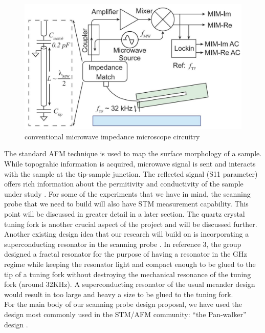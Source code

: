 \documentclass[11pt]{article}
\numberwithin{equation}{section}
\begin{document}
\begin{figure}
	\centering
	\includegraphics[scale=0.4] {mimcircuit.jpg}
	\caption{conventional microwave impedance microscope circuitry }
	\label{mimcircuit}
\end{figure}

The standard AFM technique is used to map the surface morphology of a sample.  While topograhic information is acquired, microwave signal is sent and interacts with the sample at the tip-sample junction. The reflected signal (S11 parameter) offers rich information about the permitivity and conductivity of the sample under study \cite{kejilai}.  For some of the experiments that we have in mind, the scanning probe that we need to build will also have STM measurement capability.  This point will be discussed in greater detail in a later section.  The quartz crystal tuning fork is another crucial aspect of the project and will be discussed further.\\

Another existing design idea that our research will build on is incorporating a superconducting resonator in the scanning probe \cite{graaf}.   In reference 3, the group designed a fractal resonator for the purpose of having a resonator in the GHz regime while keeping the resonator light and compact enough to be glued to the tip of a tuning fork without destroying the mechanical resonance of the tuning fork (around 32KHz).  A superconducting resonator of the usual meander design would result in too large and heavy a size to be glued to the tuning fork. \\

For the main body of our scanning probe design proposal, we have used the design most commonly used in the STM/AFM community: ``the Pan-walker'' design \cite{pan}.  \\
\end{document}
